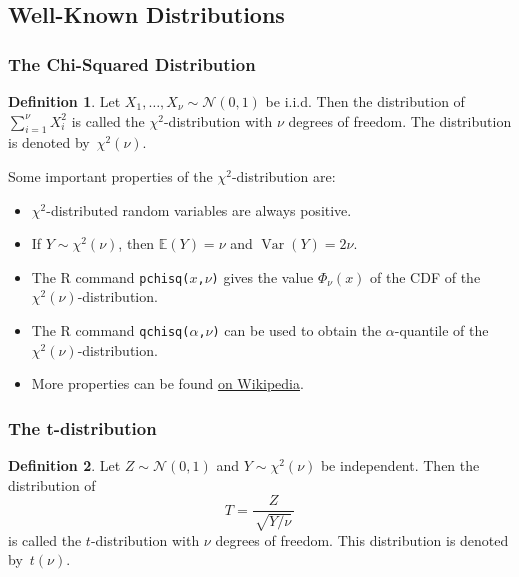 \documentclass[
  a4paper,
]{article}
\theoremstyle{definition}
\newtheorem{definition}{Definition}[section]
\theoremstyle{definition}
\theoremstyle{definition}
\theoremstyle{definition}
\theoremstyle{remark}
\begin{document}
\subsection{Well-Known Distributions}\label{well-known-distributions}

\subsubsection{The Chi-Squared Distribution}\label{chi-square}

\begin{definition}
\protect\hypertarget{def:chi-squared-dist}{}\label{def:chi-squared-dist}Let \(X_1, \ldots, X_\nu \sim \mathcal{N}(0, 1)\) be i.i.d. Then the
distribution of \(\sum_{i=1}^\nu X_i^2\) is called the
\(\chi^2\)-distribution with \(\nu\) degrees of freedom. The
distribution is denoted by~\(\chi^2(\nu)\).
\end{definition}

Some important properties of the \(\chi^2\)-distribution are:

\begin{itemize}
\item
  \(\chi^2\)-distributed random variables are always positive.
\item
  If \(Y\sim \chi^2(\nu)\), then \(\mathbb{E}(Y) = \nu\) and \(\mathop{\mathrm{Var}}(Y) = 2\nu\).
\item
  The R command \texttt{pchisq(\textbar{}}\(x\)\texttt{,}\(\nu\)\texttt{)} gives the value
  \(\Phi_\nu(x)\) of the CDF of the \(\chi^2(\nu)\)-distribution.
\item
  The R command \texttt{qchisq(}\(\alpha\)\texttt{,}\(\nu\)\texttt{)} can
  be used to obtain the
  \(\alpha\)-quantile of the \(\chi^2(\nu)\)-distribution.
\item
  More properties can be found
  \href{https://en.wikipedia.org/wiki/Chi-squared_distribution}{on Wikipedia}.
\end{itemize}

\subsubsection{The t-distribution}\label{t}

\begin{definition}
\protect\hypertarget{def:t-dist}{}\label{def:t-dist}Let \(Z \sim \mathcal{N}(0,1)\) and \(Y \sim \chi^2(\nu)\) be independent. Then
the distribution of
\begin{equation}
  T
  = \frac{\,Z\,}{\,\sqrt{Y / \nu}\,}  \label{eq:t-def}
\end{equation}
is called the \(t\)-distribution with \(\nu\) degrees of freedom.
This distribution is denoted by~\(t(\nu)\).
\end{definition}
\end{document}
